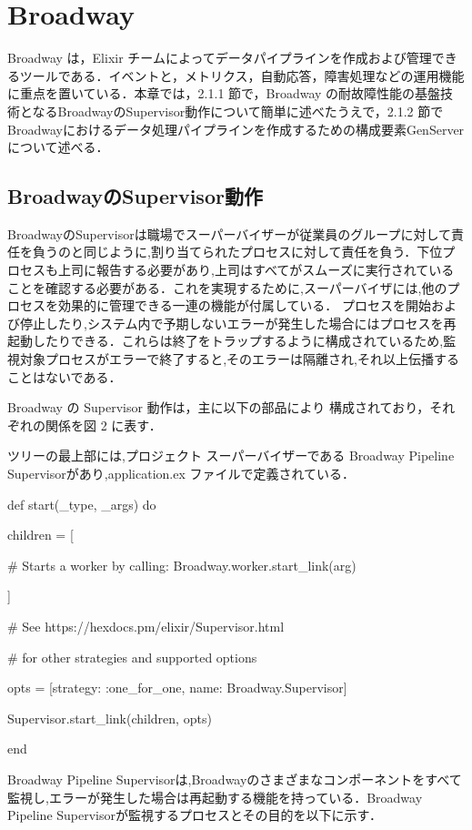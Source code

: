 \documentclass[a4paper]{jreport}	%
\begin{document}
\section{Broadway}
Broadway は，Elixir チームによってデータパイプラインを作成および管理できるツールである．イベントと，メトリクス，自動応答，障害処理などの運用機能に重点を置いている\cite{D}．本章では，2.1.1 節で，Broadway の耐故障性能の基盤技術となるBroadwayのSupervisor動作について簡単に述べたうえで，2.1.2 節で Broadwayにおけるデータ処理パイプラインを作成するための構成要素GenServerについて述べる．
\subsection{BroadwayのSupervisor動作}
BroadwayのSupervisorは職場でスーパーバイザーが従業員のグループに対して責任を負うのと同じように,割り当てられたプロセスに対して責任を負う．下位プロセスも上司に報告する必要があり,上司はすべてがスムーズに実行されていることを確認する必要がある．これを実現するために,スーパーバイザには,他のプロセスを効果的に管理できる一連の機能が付属している． プロセスを開始および停止したり,システム内で予期しないエラーが発生した場合にはプロセスを再起動したりできる．これらは終了をトラップするように構成されているため,監視対象プロセスがエラーで終了すると,そのエラーは隔離され,それ以上伝播することはないである． 

Broadway の Supervisor 動作は，主に以下の部品により 構成されており，それぞれの関係を図 2 に表す．

ツリーの最上部には,プロジェクト スーパーバイザーである Broadway Pipeline Supervisorがあり,application.ex ファイルで定義されている．

def start(\_type, \_args) do 

children = [

    \# Starts a worker by calling: Broadway.worker.start\_link(arg)
    
    
]

 \# See https://hexdocs.pm/elixir/Supervisor.html

 \# for other strategies and supported options

opts = [strategy: :one\_for\_one, name: Broadway.Supervisor] 

Supervisor.start\_link(children, opts)

end

Broadway Pipeline Supervisorは,Broadwayのさまざまなコンポーネントをすべて監視し,エラーが発生した場合は再起動する機能を持っている．Broadway Pipeline Supervisorが監視するプロセスとその目的を以下に示す．
\end{document}
